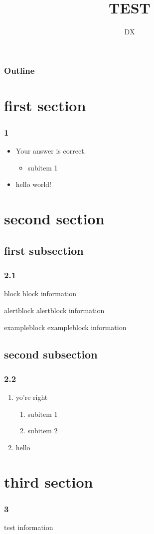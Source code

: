 \documentclass{beamer}
\begin{document}
\title{TEST}
\author{DX}
\begin{frame}
  \titlepage
\end{frame}

\begin{frame}
  \frametitle{Outline}
  \tableofcontents %
\end{frame}

\section{first section}
\begin{frame}
  \frametitle{1}
  \begin{itemize}
    \item Your answer is correct.
    \begin{itemize}
      \item subitem 1
    \end{itemize}
    \item hello world!
  \end{itemize}
\end{frame}

\section{second section}
\subsection{first subsection}
\begin{frame}
  \frametitle{2.1}
  \begin{block}{block}
    block information
  \end{block}
  \begin{alertblock}{alertblock}
    alertblock information
  \end{alertblock}
  \begin{exampleblock}{exampleblock}
    exampleblock information
  \end{exampleblock}
\end{frame}

\subsection{second subsection}
\begin{frame}
  \frametitle{2.2}
  \begin{enumerate}
    \item yo're right
    \begin{enumerate}
      \item subitem 1
      \item subitem 2
    \end{enumerate}
    \item hello
  \end{enumerate}
\end{frame}

\section{third section}
\begin{frame}
  \frametitle{3}
  test information
\end{frame}
\end{document}
